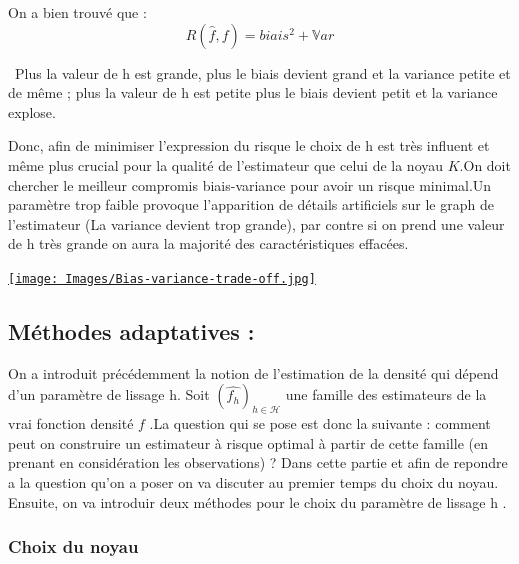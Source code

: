 \documentclass[
]{article}
\begin{document}
On a bien trouvé que : \[R(\hat{f},f)=biais^2+\mathbb Var\]

\begin{remark}\
   Plus la  valeur de h est grande, plus le biais devient grand et la variance petite et de même ;  
   plus la valeur de h est petite plus le biais devient petit et la variance explose.\newline
\end{remark}

Donc, afin de minimiser l'expression du risque le choix de h est très
influent et même plus crucial pour la qualité de l'estimateur que celui
de la noyau \(K\).\newline On doit chercher le meilleur compromis
biais-variance pour avoir un risque minimal.\newline Un paramètre trop
faible provoque l'apparition de détails artificiels sur le graph de
l'estimateur (La variance devient trop grande), par contre si on prend
une valeur de h très grande on aura la majorité des caractéristiques
effacées.\newline

\hspace*{4cm}
\href{http://chimix.com/an16/pol16/image/aspts35.jpg}{\texttt{[image: Images/Bias-variance-trade-off.jpg]}}

\subsection{Méthodes adaptatives :}

\hspace*{0.5cm} On a introduit précédemment la notion de l'estimation de
la densité qui dépend d'un paramètre de lissage h. Soit
\((\hat{f_h})_{h\in \mathcal H}\) une famille des estimateurs de la vrai
fonction densité \(f\) .\newline La question qui se pose est donc la
suivante : comment peut on construire un estimateur à risque optimal à
partir de cette famille (en prenant en considération les observations) ?
\newline \hspace*{0.5cm} Dans cette partie et afin de repondre a la
question qu'on a poser on va discuter au premier temps du choix du
noyau. Ensuite, on va introduir deux méthodes pour le choix du paramètre
de lissage h .

\subsubsection{Choix du noyau}
\end{document}
